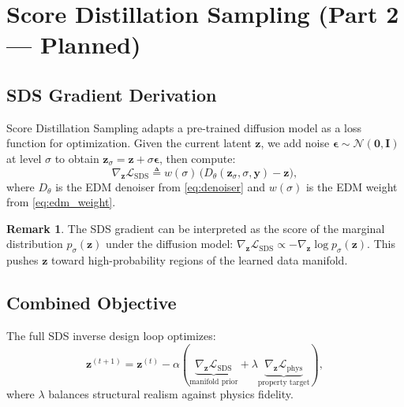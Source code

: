 \documentclass[12pt,a4paper]{article}
\newcommand{\N}{\mathcal{N}}
\newcommand{\loss}{\mathcal{L}}
\newcommand{\zvec}{\bm{z}}
\theoremstyle{definition}
\newtheorem{remark}{Remark}
\begin{document}
\section{Score Distillation Sampling (Part 2 — Planned)}
\label{sec:sds}

\subsection{SDS Gradient Derivation}

Score Distillation Sampling \cite{poole2023dreamfusion} adapts a pre-trained
diffusion model as a loss function for optimization.  Given the
current latent $\zvec$, we add noise $\bm{\epsilon} \sim \N(\bm{0}, \bm{I})$
at level $\sigma$ to obtain $\zvec_\sigma = \zvec + \sigma\bm{\epsilon}$,
then compute:
\begin{equation}
  \nabla_\zvec \loss_{\mathrm{SDS}} \triangleq w(\sigma)\, \bigl(
    D_\theta(\zvec_\sigma, \sigma, \bm{y}) - \zvec
  \bigr),
  \label{eq:sds_grad}
\end{equation}
where $D_\theta$ is the EDM denoiser from \eqref{eq:denoiser} and $w(\sigma)$
is the EDM weight from \eqref{eq:edm_weight}.

\begin{remark}
The SDS gradient can be interpreted as the score of the marginal
distribution $p_\sigma(\zvec)$ under the diffusion model:
$\nabla_\zvec \loss_{\mathrm{SDS}} \propto -\nabla_\zvec \log p_\sigma(\zvec)$.
This pushes $\zvec$ toward high-probability regions of the learned data
manifold.
\end{remark}

\subsection{Combined Objective}

The full SDS inverse design loop optimizes:
\begin{equation}
  \zvec^{(t+1)} = \zvec^{(t)} - \alpha \left(
    \underbrace{\nabla_\zvec \loss_{\mathrm{SDS}}}_{\text{manifold prior}}
    + \lambda \underbrace{\nabla_\zvec \loss_{\mathrm{phys}}}_{\text{property target}}
  \right),
  \label{eq:sds_update}
\end{equation}
where $\lambda$ balances structural realism against physics fidelity.
\end{document}
